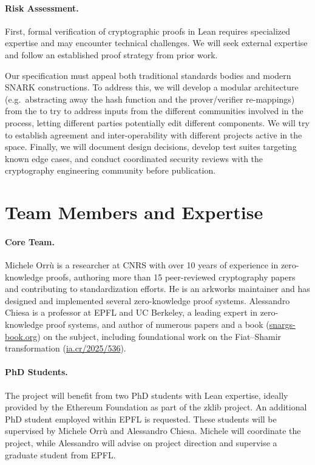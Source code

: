 \documentclass{article}
\begin{document}
\paragraph{Risk Assessment.}
First, formal verification of cryptographic proofs in Lean requires specialized expertise and may encounter technical challenges. We will seek external expertise and follow an established proof strategy from prior work.

Our specification must appeal both traditional standards bodies and modern SNARK constructions. To address this, we will develop a modular architecture (e.g.\ abstracting away the hash function and the prover/verifier re-mappings) from the  to try to address inputs from the different communities involved in the process, letting different parties potentially edit different components. We will try to establish agreement and inter-operability with different projects active in the space.
Finally, we will document design decisions, develop test suites targeting known edge cases, and conduct coordinated security reviews with the cryptography engineering community before publication.

\section{Team Members and Expertise}

\paragraph{Core Team.}
Michele Orrù is a researcher at CNRS with over 10 years of experience in zero-knowledge proofs, authoring more than 15 peer-reviewed cryptography papers and contributing to standardization efforts. He is an arkworks maintainer and has designed and implemented several zero-knowledge proof systems.
Alessandro Chiesa is a professor at EPFL and UC Berkeley, a leading expert in zero-knowledge proof systems, and author of numerous papers and a book (\href{https://snargs-book.org/}{snargs-book.org}) on the subject, including foundational work on the Fiat--Shamir transformation (\href{https://eprint.iacr.org/2025/536.pdf}{ia.cr/2025/536}).

\paragraph{PhD Students.}
The project will benefit from two PhD students with Lean expertise, ideally provided by the Ethereum Foundation as part of the zklib project. An additional PhD student employed within EPFL is requested. These students will be supervised by Michele Orrù and Alessandro Chiesa. Michele will coordinate the project, while Alessandro will advise on project direction and supervise a graduate student from EPFL.
\end{document}
